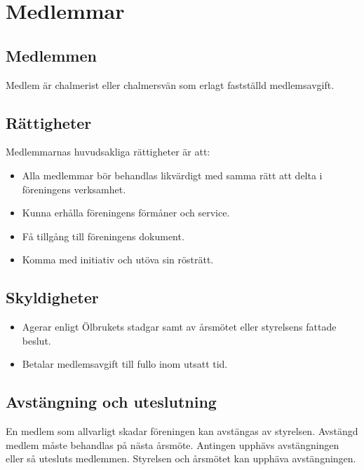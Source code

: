 \section{Medlemmar}

\subsection{Medlemmen}
Medlem är chalmerist eller chalmersvän som erlagt fastställd medlemsavgift.

\subsection{Rättigheter}
Medlemmarnas huvudsakliga rättigheter är att:
\begin{itemize}
    \item Alla medlemmar bör behandlas likvärdigt med samma rätt att delta i föreningens verksamhet.
    \item Kunna erhålla föreningens förmåner och service.
    \item Få tillgång till föreningens dokument.
    \item Komma med initiativ och utöva sin rösträtt.
\end{itemize}

\subsection{Skyldigheter}
\begin{itemize}
    \item Agerar enligt Ölbrukets stadgar samt av årsmötet eller styrelsens fattade beslut.
    \item Betalar medlemsavgift till fullo inom utsatt tid.
\end{itemize}

\subsection{Avstängning och uteslutning}
En medlem som allvarligt skadar föreningen kan avstängas av styrelsen. Avstängd medlem måste behandlas på nästa årsmöte. Antingen upphävs avstängningen eller så utesluts medlemmen. Styrelsen och årsmötet kan upphäva avstängningen.